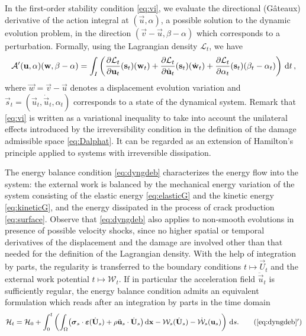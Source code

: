 In the first-order stability condition \eqref{eq:vi}, we evaluate the directional (Gâteaux) derivative of the action integral at $(\vec{u},\alpha)$, a possible solution to the dynamic evolution problem, in the direction $(\vec{v}-\vec{u},\beta-\alpha)$ which corresponds to a perturbation. Formally, using the Lagrangian density $\mathcal{L}_t$, we have
\[
\mathcal{A}'(\vec{u},\alpha)(\vec{w},\beta-\alpha)=\int_I\left(\frac{\partial \mathcal{L}_t}{\partial\vec{u}_t}(\vec{s}_t)(\vec{w}_t)+\frac{\partial \mathcal{L}_t}{\partial\dot{\vec{u}}_t}(\vec{s}_t)(\dot{\vec{w}}_t)+\frac{\partial \mathcal{L}_t}{\partial\alpha_t}(\vec{s}_t)(\beta_t-\alpha_t)\right)\D{t}\,,
\]
where $\vec{w}=\vec{v}-\vec{u}$ denotes a displacement evolution variation and $\vec{s}_t=(\vec{u}_t,\dot{\vec{u}}_t,\alpha_t)$ corresponds to a state of the dynamical system. Remark that \eqref{eq:vi} is written as a variational inequality to take into account the unilateral effects introduced by the irreversibility condition in the definition of the damage admissible space \eqref{eq:Dalphat}. It can be regarded as an extension of Hamilton's principle applied to systems with irreversible dissipation.

The energy balance condition \eqref{eq:dyngdeb} characterizes the energy flow into the system: the external work is balanced by the mechanical energy variation of the system consisting of the elastic energy \eqref{eq:elasticG} and the kinetic energy \eqref{eq:kineticG}, and the energy dissipated in the process of crack production \eqref{eq:surface}. Observe that \eqref{eq:dyngdeb} also applies to non-smooth evolutions in presence of possible velocity shocks, since no higher spatial or temporal derivatives of the displacement and the damage are involved other than that needed for the definition of the Lagrangian density. With the help of integration by parts, the regularity is transferred to the boundary conditions $t\mapsto \vec{U}_t$ and the external work potential $t\mapsto \mathcal{W}_t$. If in particular the acceleration field $\ddot{\vec{u}}_t$ is sufficiently regular, the energy balance condition admits an equivalent formulation which reads after an integration by parts in the time domain
\begin{align} \label{eq:dyngdeb2}
\mathcal{H}_t=\mathcal{H}_0+\int_0^t\left(\int_\Omega\bigl(\sig_s\cdot\eps(\dot{\vec{U}}_s)+\rho\ddot{\vec{u}}_s\cdot\dot{\vec{U}}_s\bigr)\dx-\mathcal{W}_s(\dot{\vec{U}}_s)-\dot{\mathcal{W}}_s(\vec{u}_s)\right)\D{s}. \tag{\ref*{eq:dyngdeb}${}^\prime$}
\end{align}

